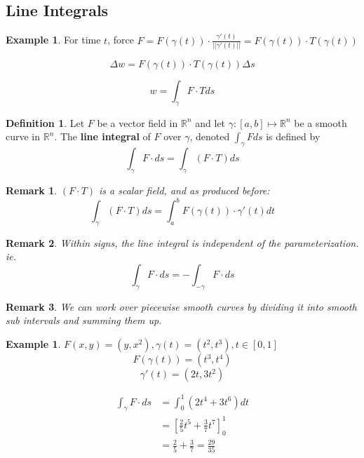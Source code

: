 \documentclass[12pt]{article}
\theoremstyle{plain}
\newtheorem*{remark}{Remark}
\theoremstyle{definition}
\newtheorem{definition}[theorem]{Definition}
\newtheorem{example}[theorem]{Example}
\begin{document}
\subsection{Line Integrals}

\begin{example}
	For time $t$, force $F = F(\gamma(t)) \cdot \frac{\gamma ' (t)}{||\gamma ' (t)||} = F(\gamma (t)) \cdot T (\gamma (t))$

	$$\Delta w = F(\gamma(t)) \cdot T (\gamma (t)) \Delta s$$

	$$w= \int_\gamma F \cdot T ds$$

\end{example}

\begin{definition}
	Let $F$ be a vector field in $\mathbb{R}^n$ and let $\gamma : [a,b] \mapsto \mathbb{R}^n$ be a smooth curve in $\mathbb{R}^n$. The \textbf{line integral} of $F$ over $\gamma$, denoted $\int_\gamma F ds$ is defined by
	$$\int_\gamma F \cdot ds = \int_\gamma ( F \cdot T) ds$$
\end{definition}

\begin{remark}
	$(F \cdot T)$ is a scalar field, and as produced before:
	$$\int_\gamma ( F \cdot T) ds = \int_a^b F(\gamma(t)) \cdot \gamma ' (t) dt$$
\end{remark}

\begin{remark}
	Within signs, the line integral is independent of the parameterization. ie.
	$$\int_\gamma F \cdot ds = - \int_{-\gamma} F \cdot ds$$
\end{remark}

\begin{remark}
	We can work over piecewise smooth curves by dividing it into smooth sub intervals and summing them up.
\end{remark}

\begin{example}
	$F(x,y) = (y,x^2), \gamma (t) = (t^2, t^3), t\in[0,1]$
	$$F(\gamma (t)) = (t^3, t^4)$$
	$$\gamma ' (t) = (2t, 3t^2)$$

	\begin{align*}
		\int_\gamma F \cdot ds &= \int_0^1 (2t^4 + 3t^6) dt\\
		&= [\frac{2}{5} t^5 + \frac{3}{7} t^7]^1_0\\
		&= \frac{2}{5}+ \frac{3}{7} = \frac{29}{35}
	\end{align*}

\end{example}
\end{document}
